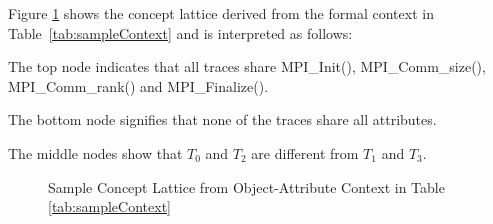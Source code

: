 %
Figure \ref{fig:sampleCL} shows the concept lattice derived from the formal context in
Table~\ref{tab:sampleContext} and is interpreted as follows:

\begin{compactitem}
\item The top node indicates that all traces share MPI\_Init(),
  MPI\_Comm\_size(), MPI\_Comm\_rank() and MPI\_Finalize().
    \item The bottom node signifies that none of the traces share all attributes. 
    \item The middle nodes show that $T_0$ and $T_2$ are different from  $T_1$ and $T_3$.
\end{compactitem}



% 

%


\begin{figure}[t]
\centering
{}
\caption{Sample Concept Lattice from Object-Attribute Context in Table \ref{tab:sampleContext}}
\label{fig:sampleCL}
\end{figure}


